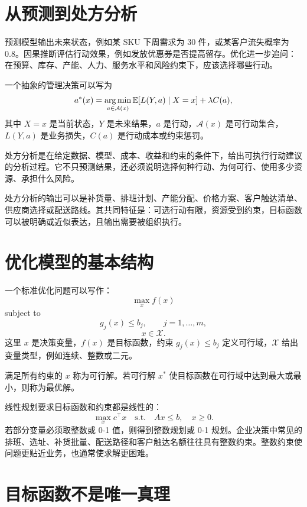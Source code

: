 \documentclass[UTF8,fontset=fandol,openany,zihao=-4]{ctexbook}
\begin{document}
\section{从预测到处方分析}

预测模型输出未来状态，例如某 SKU 下周需求为 30 件，或某客户流失概率为 0.8。因果推断评估行动效果，例如发放优惠券是否提高留存。优化进一步追问：在预算、库存、产能、人力、服务水平和风险约束下，应该选择哪些行动。

一个抽象的管理决策可以写为
\[
  a^*(x)
  =
  \operatorname*{arg\,min}_{a\in\mathcal A(x)}
  \mathbb E[L(Y,a)\mid X=x]
  +
  \lambda C(a),
\]
其中 \(X=x\) 是当前状态，\(Y\) 是未来结果，\(a\) 是行动，\(\mathcal A(x)\) 是可行动集合，\(L(Y,a)\) 是业务损失，\(C(a)\) 是行动成本或约束惩罚。

\begin{definition}[处方分析]
处方分析是在给定数据、模型、成本、收益和约束的条件下，给出可执行行动建议的分析过程。它不只预测结果，还必须说明选择何种行动、为何可行、使用多少资源、承担什么风险。
\end{definition}

处方分析的输出可以是补货量、排班计划、产能分配、价格方案、客户触达清单、供应商选择或配送路线。其共同特征是：可选行动有限，资源受到约束，目标函数可以被明确或近似表达，且输出需要被组织执行。

\section{优化模型的基本结构}

一个标准优化问题可以写作：
\[
  \max_{x} f(x)
\]
subject to
\[
  g_j(x)\le b_j,\qquad j=1,\ldots,m,
\]
\[
  x\in\mathcal X.
\]
这里 \(x\) 是决策变量，\(f(x)\) 是目标函数，约束 \(g_j(x)\le b_j\) 定义可行域，\(\mathcal X\) 给出变量类型，例如连续、整数或二元。

\begin{definition}[可行解与最优解]
满足所有约束的 \(x\) 称为可行解。若可行解 \(x^*\) 使目标函数在可行域中达到最大或最小，则称为最优解。
\end{definition}

线性规划要求目标函数和约束都是线性的：
\[
  \max_x c^\top x
  \quad
  \text{s.t.}
  \quad
  Ax\le b,\quad x\ge 0.
\]
若部分变量必须取整数或 0-1 值，则得到整数规划或 0-1 规划。企业决策中常见的排班、选址、补货批量、配送路径和客户触达名额往往具有整数约束。整数约束使问题更贴近业务，也通常使求解更困难。

\section{目标函数不是唯一真理}
\end{document}

